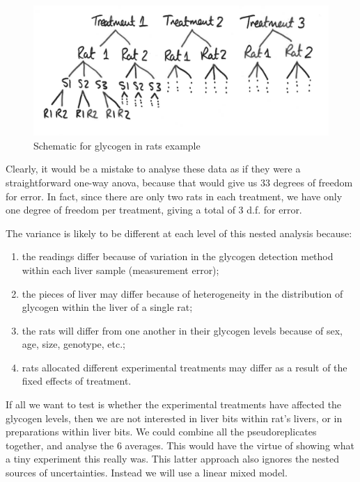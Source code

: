 \documentclass[]{book}
\providecommand{\tightlist}{%
  \setlength{\itemsep}{0pt}\setlength{\parskip}{0pt}}
\theoremstyle{definition}
\theoremstyle{definition}
\theoremstyle{definition}
\theoremstyle{remark}
\begin{document}
\begin{figure}

{\centering \includegraphics[width=0.8\linewidth,height=0.8\textheight]{_img/rats} 

}

\caption{Schematic for glycogen in rats example}\label{fig:rats}
\end{figure}

Clearly, it would be a mistake to analyse these data as if they were a
straightforward one-way anova, because that would give us 33 degrees of
freedom for error. In fact, since there are only two rats in each
treatment, we have only one degree of freedom per treatment, giving a
total of 3 d.f. for error.

The variance is likely to be different at each level of this nested
analysis because:

\begin{enumerate}
\def\labelenumi{\arabic{enumi}.}
\tightlist
\item
  the readings differ because of variation in the glycogen detection
  method within each liver sample (measurement error);
\item
  the pieces of liver may differ because of heterogeneity in the
  distribution of glycogen within the liver of a single rat;
\item
  the rats will differ from one another in their glycogen levels because
  of sex, age, size, genotype, etc.;
\item
  rats allocated different experimental treatments may differ as a
  result of the fixed effects of treatment.
\end{enumerate}

If all we want to test is whether the experimental treatments have
affected the glycogen levels, then we are not interested in liver bits
within rat's livers, or in preparations within liver bits. We could
combine all the pseudoreplicates together, and analyse the 6 averages.
This would have the virtue of showing what a tiny experiment this really
was. This latter approach also ignores the nested sources of
uncertainties. Instead we will use a linear mixed model.
\end{document}
